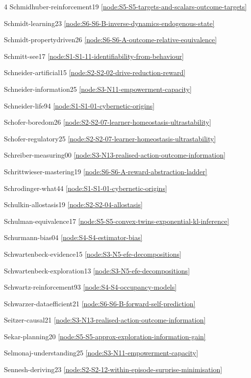 \documentclass[10pt]{article}
\begin{document}
{\begin{multicols}{4}
Schmidhuber-reinforcement19 \hfill \ref{node:S5-S5-targets-and-scalars-outcome-targets}\par
Schmidt-learning23 \hfill \ref{node:S6-S6-B-inverse-dynamics-endogenous-state}\par
Schmidt-propertydriven26 \hfill \ref{node:S6-S6-A-outcome-relative-equivalence}\par
Schmitt-see17 \hfill \ref{node:S1-S1-11-identifiability-from-behaviour}\par
Schneider-artificial15 \hfill \ref{node:S2-S2-02-drive-reduction-reward}\par
Schneider-information25 \hfill \ref{node:S3-N11-empowerment-capacity}\par
Schneider-life94 \hfill \ref{node:S1-S1-01-cybernetic-origins}\par
Schofer-boredom26 \hfill \ref{node:S2-S2-07-learner-homeostasis-ultrastability}\par
Schofer-regulatory25 \hfill \ref{node:S2-S2-07-learner-homeostasis-ultrastability}\par
Schreiber-measuring00 \hfill \ref{node:S3-N13-realised-action-outcome-information}\par
Schrittwieser-mastering19 \hfill \ref{node:S6-S6-A-reward-abstraction-ladder}\par
Schrodinger-what44 \hfill \ref{node:S1-S1-01-cybernetic-origins}\par
Schulkin-allostasis19 \hfill \ref{node:S2-S2-04-allostasis}\par
Schulman-equivalence17 \hfill \ref{node:S5-S5-convex-twins-exponential-kl-inference}\par
Schurmann-bias04 \hfill \ref{node:S4-S4-estimator-bias}\par
Schwartenbeck-evidence15 \hfill \ref{node:S3-N5-efe-decompositions}\par
Schwartenbeck-exploration13 \hfill \ref{node:S3-N5-efe-decompositions}\par
Schwartz-reinforcement93 \hfill \ref{node:S4-S4-occupancy-models}\par
Schwarzer-dataefficient21 \hfill \ref{node:S6-S6-B-forward-self-prediction}\par
Seitzer-causal21 \hfill \ref{node:S3-N13-realised-action-outcome-information}\par
Sekar-planning20 \hfill \ref{node:S5-S5-approx-exploration-information-gain}\par
Selmonaj-understanding25 \hfill \ref{node:S3-N11-empowerment-capacity}\par
Sennesh-deriving23 \hfill \ref{node:S2-S2-12-within-episode-surprise-minimisation}\par

\end{multicols}}
\end{document}
